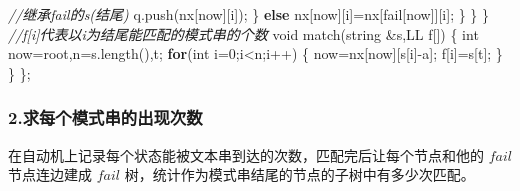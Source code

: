 \documentclass[
]{article}
\newenvironment{Shaded}{}{}
\newcommand{\CharTok}[1]{\textcolor[rgb]{0.25,0.44,0.63}{#1}}
\newcommand{\CommentTok}[1]{\textcolor[rgb]{0.38,0.63,0.69}{\textit{#1}}}
\newcommand{\ControlFlowTok}[1]{\textcolor[rgb]{0.00,0.44,0.13}{\textbf{#1}}}
\newcommand{\DataTypeTok}[1]{\textcolor[rgb]{0.56,0.13,0.00}{#1}}
\newcommand{\DecValTok}[1]{\textcolor[rgb]{0.25,0.63,0.44}{#1}}
\newcommand{\NormalTok}[1]{#1}
\begin{document}
\begin{Shaded}
\begin{Highlighting}[]
                    \CommentTok{//继承fail的s(结尾)}
\NormalTok{                    q.push(nx[now][i]);}
\NormalTok{                \}}
                \ControlFlowTok{else}\NormalTok{ nx[now][i]=nx[fail[now]][i];}
\NormalTok{            \}}
\NormalTok{        \}}
\NormalTok{    \}}
    \CommentTok{//f[i]代表以i为结尾能匹配的模式串的个数}
    \DataTypeTok{void}\NormalTok{ match(string \&s,LL f[])}
\NormalTok{    \{}
        \DataTypeTok{int}\NormalTok{ now=root,n=s.length(),t;}
        \ControlFlowTok{for}\NormalTok{(}\DataTypeTok{int}\NormalTok{ i=}\DecValTok{0}\NormalTok{;i\textless{}n;i++)}
\NormalTok{        \{}
\NormalTok{            now=nx[now][s[i]{-}}\CharTok{\textquotesingle{}a\textquotesingle{}}\NormalTok{];}
\NormalTok{            f[i]=s[t];}
\NormalTok{        \}}
\NormalTok{    \}}
\NormalTok{\};}
\end{Highlighting}
\end{Shaded}

\hypertarget{ux6c42ux6bcfux4e2aux6a21ux5f0fux4e32ux7684ux51faux73b0ux6b21ux6570}{%
\subsubsection{2.求每个模式串的出现次数}\label{ux6c42ux6bcfux4e2aux6a21ux5f0fux4e32ux7684ux51faux73b0ux6b21ux6570}}

在自动机上记录每个状态能被文本串到达的次数，匹配完后让每个节点和他的
\(fail\) 节点连边建成 \(fail\)
树，统计作为模式串结尾的节点的子树中有多少次匹配。
\end{document}
